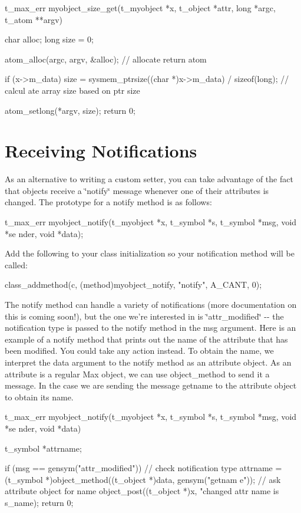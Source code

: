\begin{DoxyCode}
    t_max_err myobject_size_get(t_myobject *x, t_object *attr, long *argc, 
      t_atom **argv)
    {
        char alloc;
        long size = 0;
 
        atom_alloc(argc, argv, &alloc);     // allocate return atom
 
        if (x->m_data)
            size = sysmem_ptrsize((char *)x->m_data) / sizeof(long);    // calcul
      ate array size based on ptr size
 
        atom_setlong(*argv, size);
        return 0;
    }
\end{DoxyCode}
\hypertarget{chapter_msgattached_chapter_msgattached_receiving}{}\section{Receiving Notifications}\label{chapter_msgattached_chapter_msgattached_receiving}
As an alternative to writing a custom setter, you can take advantage of the fact that objects receive a \char`\"{}notify\char`\"{} message whenever one of their attributes is changed. The prototype for a notify method is as follows:


\begin{DoxyCode}
    t_max_err myobject_notify(t_myobject *x, t_symbol *s, t_symbol *msg, void *se
      nder, void *data);
\end{DoxyCode}


Add the following to your class initialization so your notification method will be called:


\begin{DoxyCode}
    class_addmethod(c, (method)myobject_notify, "notify", A_CANT, 0);
\end{DoxyCode}


The notify method can handle a variety of notifications (more documentation on this is coming soon!), but the one we're interested in is \char`\"{}attr\_\-modified\char`\"{} -\/-\/ the notification type is passed to the notify method in the msg argument. Here is an example of a notify method that prints out the name of the attribute that has been modified. You could take any action instead. To obtain the name, we interpret the data argument to the notify method as an attribute object. As an attribute is a regular Max object, we can use object\_\-method to send it a message. In the case we are sending the message getname to the attribute object to obtain its name.


\begin{DoxyCode}
    t_max_err myobject_notify(t_myobject *x, t_symbol *s, t_symbol *msg, void *se
      nder, void *data)
    {
        t_symbol *attrname;
 
        if (msg == gensym("attr_modified")) {       // check notification type
            attrname = (t_symbol *)object_method((t_object *)data, gensym("getnam
      e"));       // ask attribute object for name
            object_post((t_object *)x, "changed attr name is %
      s_name);
        }
        return 0;
    }
\end{DoxyCode}
 
